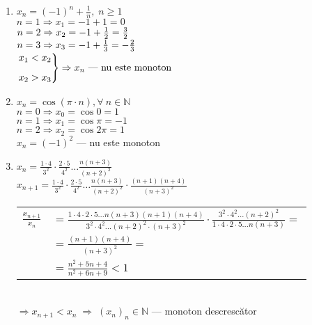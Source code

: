 \documentclass[a4paper, 12pt, notitlepage]{book}
\begin{document}
\begin{enumerate}
\begin{enumerate}[\quad a.]
              \item $x_{n} = (-1)^{n} + \frac{1}{n}, \; n \ge 1$\\[5pt]
                    $n = 1 \Rightarrow x_{1} = -1 +1 = 0$\\[5pt]
                    $n = 2 \Rightarrow x_{2} = -1 + {1 \over 2} = \frac{3}{2} $\\[5pt]
                    $n = 3 \Rightarrow x_{3} = -1 + {1 \over 3} = - \frac{2}{3}$\\[5pt]
                    \begin{math}
                      \begin{rcases}
                        x_{1} < x_{2}\\[5pt]
                        x_{2} > x_{3}
                      \end{rcases}
                      \Rightarrow x_{n} \text{ --- nu este monoton }
                    \end{math}

              \item $x_{n} = \cos (\pi \cdot n), \forall\ n \in \mathbb{N}$\\[5pt]
                    $n = 0 \Rightarrow x_{0} = \cos 0    = 1$\\[5pt]
                    $n = 1 \Rightarrow x_{1} = \cos \pi  = -1 $\\[5pt]
                    $n = 2 \Rightarrow x_{2} = \cos 2\pi = 1 $\\[5pt]
                    $x_{n} = {(-1)}^{2}$ --- nu este monoton

              \item $x_{n} = \frac{1 \cdot 4}{3^{2}} \cdot \frac{2 \cdot 5}{4^{2}} \ldots \frac{n(n+3)}{{(n+2)}^{2}}$\\[5pt]
                      $x_{n+1}= \frac{1 \cdot 4}{3^{2}} \cdot \frac{2 \cdot 5}{4^{2}} \ldots \frac{n(n+3)}{{(n+2)}^{2}} \cdot \frac{(n+1)(n+4)}{{(n+3)}^{2}}$\\[5pt]

                    \begin{tabular}{ll}
                      $\frac{x_{n+1}}{x_{n}}$ & $= \frac{1 \cdot 4 \cdot 2 \cdot 5 \ldots n(n+3)(n+1)(n+4)}{3^{2} \cdot 4^{2} \ldots {(n+2)}^{2} \cdot {(n+3)}^{2}} \cdot \frac{3^{2} \cdot 4^{2} \ldots {(n+2)}^{2}}{1 \cdot 4 \cdot 2 \cdot 5 \ldots n(n+3)} =$\\[5pt]
                                              & $= \frac{(n+1)(n+4)}{(n+3)^{2}}=$\\[5pt]
                                              & $= \frac{n^{2} + 5n + 4}{n^{2} + 6n + 9} < 1$
                    \end{tabular}\\[5pt]
                    $\Rightarrow x_{n+1} < x_{n} \; \Rightarrow \; (x_{n})_{n} \in \mathbb{N} $ --- monoton descresc\u{a}tor
            \end{enumerate}
    \end{enumerate}
\end{document}
